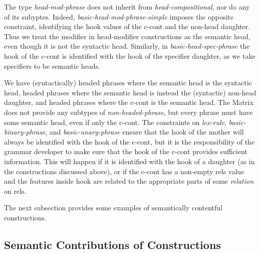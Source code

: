 \documentclass[12pt]{article}
\begin{document}
The type {\it head-mod-phrase} does not inherit from {\it
head-compositional}, nor do any of its subyptes.  Indeed, {\it
basic-head-mod-phrase-simple} imposes the opposite constraint,
identifying the {\sc hook} values of the {\sc c-cont} and the non-head
daughter.
Thus we treat the modifier in head-modifier constructions as the semantic
head, even though it is not the syntactic head.  Similarly, in {\it
basic-head-spec-phrase} the {\sc hook} of the {\sc c-cont} is
identified with the {\sc hook} of the specifier daughter, as we take
specifiers to be semantic heads.

We have (syntactically) headed phrases where the semantic head is
the syntactic head, headed phrases where the semantic head is instead
the (syntactic) non-head daughter, and headed phrases where the {\sc
c-cont} is the semantic head.  The Matrix does not provide any
subtypes of {\it non-headed-phrase}, but every phrase must have
some semantic head, even if only the {\sc c-cont}.  The constraints
on {\it lex-rule}, {\it basic-binary-phrase}, and {\it basic-unary-phrase}
ensure that the {\sc hook} of the mother will always be identified
with the {\sc hook} of the {\sc c-cont}, but it is the responsibility
of the grammar developer to make sure that the {\sc hook} of the
{\sc c-cont} provides sufficient information.  This will happen if
it is identified with the {\sc hook} of a daughter (as in
the constructions discussed above), or if the {\sc c-cont} has
a non-empty {\sc rels} value and the features inside {\sc hook}
are related to the appropriate parts of some {\it relation} on 
{\sc rels}.

The next subsection provides some examples of semantically
contentful constructions.

\subsection{Semantic Contributions of Constructions}
\label{ccontsec}
\end{document}

